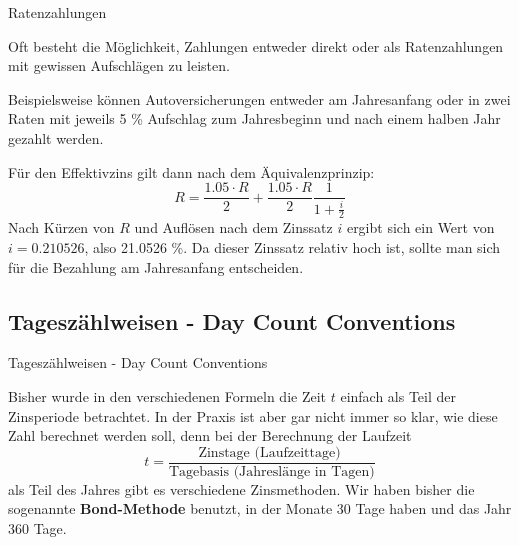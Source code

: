 \begin{frame}{Ratenzahlungen}
	\begin{example}
		Oft besteht die Möglichkeit, Zahlungen entweder direkt oder als Ratenzahlungen mit gewissen Aufschlägen zu leisten.
		
		Beispielsweise können Autoversicherungen entweder am Jahresanfang oder in zwei Raten mit jeweils 5 \% Aufschlag zum Jahresbeginn und nach einem halben Jahr gezahlt werden.
		
		Für den Effektivzins gilt dann nach dem Äquivalenzprinzip:
		\[
		R =  \frac{1.05 \cdot R}{2} +  \frac{1.05 \cdot R}{2} \frac{1}{1+\frac{i}{2}}
		\]
		Nach Kürzen von $R$ und Auflösen nach dem Zinssatz $i$ ergibt sich ein Wert von $i=0.210526$, also 21.0526 \%. Da dieser Zinssatz relativ hoch ist, sollte man sich für die Bezahlung am Jahresanfang entscheiden.
	\end{example}
\end{frame}

\subsection{Tageszählweisen - Day Count Conventions}
\begin{frame}{Tageszählweisen - Day Count Conventions}
	\begin{bemerkung}
		Bisher wurde in den verschiedenen Formeln die Zeit $t$ einfach als Teil der Zinsperiode betrachtet. In der Praxis ist aber gar nicht immer so klar, wie diese Zahl berechnet werden soll, denn bei der Berechnung der Laufzeit
		\[
		t = \frac{\text{Zinstage (Laufzeittage) }}{\text{Tagebasis (Jahreslänge in Tagen)}}
		\]
		als Teil des Jahres gibt es verschiedene Zinsmethoden. Wir haben bisher die sogenannte \textbf{Bond-Methode} benutzt, in der Monate 30 Tage haben und das Jahr 360 Tage.
	\end{bemerkung}
\end{frame}

